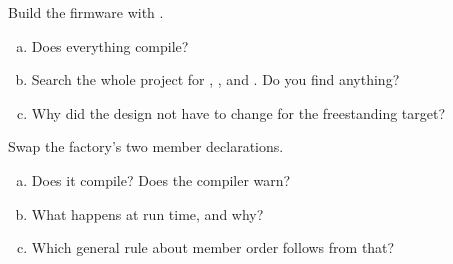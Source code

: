 \label{ex:12:4}
Build the firmware with .
\begin{enumerate}[a)]
  \item Does everything compile?
  \item Search the whole project for , ,  and
    . Do you find anything?
  \item Why did the design not have to change for the freestanding target?
\end{enumerate}

\label{ex:12:5}
Swap the factory's two member declarations.
\begin{enumerate}[a)]
  \item Does it compile? Does the compiler warn?
  \item What happens at run time, and why?
  \item Which general rule about member order follows from that?
\end{enumerate}
